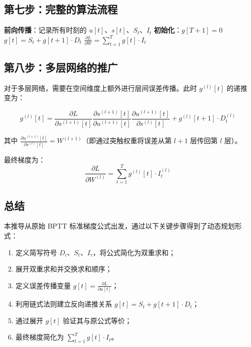 \documentclass[journal,12pt,onecolumn]{IEEEtran}
\begin{document}
\subsection{第七步：完整的算法流程}

\begin{algorithm}[h]
\caption{BPTT 动态规划实现}
\begin{algorithmic}
\STATE \textbf{前向传播}：记录所有时刻的 \(u[t]\)、\(s[t]\)、\(S_t\)、\(I_t\)
\STATE \textbf{初始化}：\(g[T+1] = 0\)
    \STATE \(g[t] = S_t + g[t+1] \cdot D_t\)  
\ENDFOR
\STATE \(\displaystyle \frac{\partial L}{\partial W} = \sum_{t=1}^T g[t] \cdot I_t\)  
\end{algorithmic}
\end{algorithm}

\subsection{第八步：多层网络的推广}

对于多层网络，需要在空间维度上额外进行层间误差传播。此时 \(g^{(l)}[t]\) 的递推变为：

\begin{equation}
g^{(l)}[t] =
\frac{\partial L}{\partial s^{(l+1)}[t]}
\frac{\partial s^{(l+1)}[t]}{\partial u^{(l+1)}[t]}
\frac{\partial u^{(l+1)}[t]}{\partial s^{(l)}[t]}
+
g^{(l)}[t+1] \cdot D_t^{(l)}
\label{eq:g_multilayer}
\end{equation}

其中 \(\frac{\partial u^{(l+1)}[t]}{\partial s^{(l)}[t]} = W^{(l+1)}\)（即通过突触权重将误差从第 \(l+1\) 层传回第 \(l\) 层）。

最终梯度为：
\begin{equation}
\frac{\partial L}{\partial W^{(l)}} = \sum_{t=1}^T g^{(l)}[t] \cdot I_t^{(l)}
\label{eq:gradient_multilayer}
\end{equation}

\subsection{总结}

本推导从原始 BPTT 标准梯度公式出发，通过以下关键步骤得到了动态规划形式：

\begin{enumerate}
    \item 定义简写符号 \(D_i\)、\(S_t\)、\(I_\tau\)，将公式简化为双重求和；
    \item 展开双重求和并交换求和顺序；
    \item 定义误差传播变量 \(g[t] = \frac{\partial L}{\partial u[t]}\)；
    \item 利用链式法则建立反向递推关系 \(g[t] = S_t + g[t+1] \cdot D_t\)；
    \item 通过展开 \(g[t]\) 验证其与原公式等价；
    \item 最终梯度简化为 \(\sum_{t=1}^T g[t] \cdot I_t\)。
\end{enumerate}
\end{document}
